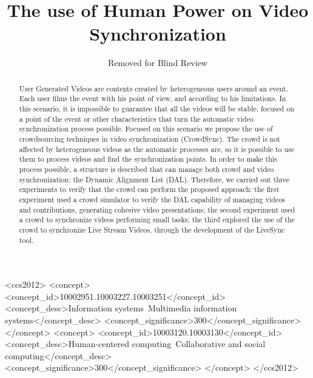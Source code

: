 \documentclass[sigconf]{acmart}
\begin{document}
\title{The use of Human Power on Video Synchronization}


\author{Removed for Blind Review}


\renewcommand{\shortauthors}{Removed for Blind Review}


\begin{abstract}
User Generated Videos are contents created by heterogeneous users around an event. Each user films the event with his point of view, and according to his limitations. In this scenario, it is impossible to guarantee that all the videos will be stable, focused on a point of the event or other characteristics that turn the automatic video synchronization process possible. Focused on this scenario we propose the use of crowdsourcing techniques in video synchronization (CrowdSync). The crowd is not affected by heterogeneous videos as the automatic processes are, so it is possible to use them to process videos and find the synchronization points.  In order to make this process possible, a structure is described that can manage both crowd and video synchronization: the Dynamic Alignment List (DAL). Therefore, we carried out three experiments to verify that the crowd can perform the proposed approach: the first experiment used a crowd simulator to verify the DAL capability of managing videos and contributions, generating cohesive video presentations; the second experiment used a crowd to synchronize videos performing small tasks; the third explored the use of the crowd to synchronize Live Stream Videos, through the development of the LiveSync tool.
\end{abstract}

%
%
\begin{CCSXML}
<ccs2012>
<concept>
<concept_id>10002951.10003227.10003251</concept_id>
<concept_desc>Information systems~Multimedia information systems</concept_desc>
<concept_significance>300</concept_significance>
</concept>
<concept>
<concept_id>10003120.10003130</concept_id>
<concept_desc>Human-centered computing~Collaborative and social computing</concept_desc>
<concept_significance>300</concept_significance>
</concept>
</ccs2012>
\end{CCSXML}

\end{document}

